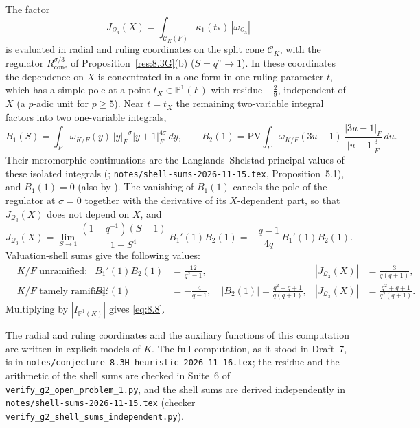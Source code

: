 \documentclass[12pt,letterpaper]{amsart}
\theoremstyle{plain}
\theoremstyle{definition}
\theoremstyle{remark}
\theoremstyle{definition}
\begin{document}
The factor
\[
J_{\mathcal Q_3}(X)=\int_{\mathcal C_K(F)}\kappa_1(t_*)\,|\omega_{\mathcal Q_3}|
\]
is evaluated in radial and ruling coordinates on the split cone
$\mathcal C_K$, with the regulator $R_{\mathrm{cone}}^{\sigma/3}$ of
Proposition~\ref{res:8.3G}(b) ($S=q^\sigma\to1$). In these coordinates the
dependence on $X$ is concentrated in a one-form in one ruling parameter $t$,
which has a simple pole at a point $t_X\in\mathbb P^1(F)$ with residue
$-\frac29$, independent of $X$ (a $p$-adic unit for $p\ge5$). Near $t=t_X$ the
remaining two-variable integral factors into two one-variable integrals,
\[
B_1(S)=\int_F\omega_{K/F}(y)\,|y|_F^{-\sigma}|y+1|_F^{4\sigma}\,dy,\qquad
B_2(1)=\mathrm{PV}\!\int_F\omega_{K/F}(3u-1)\,\frac{|3u-1|_F}{|u-1|_F^3}\,du .
\]
Their meromorphic continuations are the Langlands--Shelstad principal values of
these isolated integrals (\cite[\S1, Lemma~1.A]{LS83};
\texttt{notes/shell-sums-2026-11-15.tex}, Proposition~5.1), and
$B_1(1)=0$ (also by \cite[Lemma~1.C]{LS83}). The vanishing of $B_1(1)$ cancels
the pole of the regulator at $\sigma=0$ together with the derivative of its
$X$-dependent part, so that $J_{\mathcal Q_3}(X)$ does not depend on $X$, and
\[
J_{\mathcal Q_3}(X)=\lim_{S\to1}\frac{(1-q^{-1})(S-1)}{1-S^4}\,B_1'(1)B_2(1)
=-\frac{q-1}{4q}\,B_1'(1)B_2(1).
\]
Valuation-shell sums give the following values:
\begin{align*}
&\text{$K/F$ unramified:} &
B_1'(1)B_2(1)&=\frac{12}{q^2-1}, &
|J_{\mathcal Q_3}(X)|&=\frac{3}{q(q+1)},\\
&\text{$K/F$ tamely ramified:} &
B_1'(1)&=-\frac{4}{q-1},\quad |B_2(1)|=\frac{q^2+q+1}{q(q+1)}, &
|J_{\mathcal Q_3}(X)|&=\frac{q^2+q+1}{q^2(q+1)}.
\end{align*}
Multiplying by $|I_{\mathbb P^1(K)}|$ gives \eqref{eq:8.8}.

The radial and ruling coordinates and the auxiliary functions of this
computation are written in explicit models of $K$. The full computation, as it
stood in Draft~7, is in \texttt{notes/conjecture-8.3H-heuristic-2026-11-16.tex};
the residue and the arithmetic of the shell sums are checked in Suite~6 of
\texttt{verify\_g2\_open\_problem\_1.py}, and the shell sums are derived
independently in \texttt{notes/shell-sums-2026-11-15.tex} (checker
\texttt{verify\_g2\_shell\_sums\_independent.py}).
\end{document}
